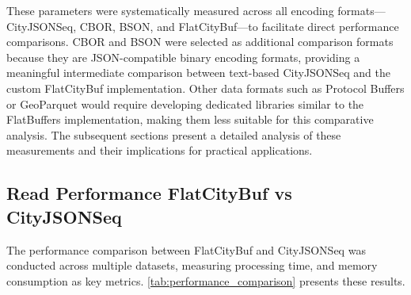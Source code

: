 These parameters were systematically measured across all encoding formats—CityJSONSeq, CBOR, BSON, and FlatCityBuf—to facilitate direct performance comparisons. CBOR and BSON were selected as additional comparison formats because they are JSON-compatible binary encoding formats, providing a meaningful intermediate comparison between text-based CityJSONSeq and the custom FlatCityBuf implementation. Other data formats such as Protocol Buffers or GeoParquet would require developing dedicated libraries similar to the FlatBuffers implementation, making them less suitable for this comparative analysis. The subsequent sections present a detailed analysis of these measurements and their implications for practical applications.

\subsection{Read Performance FlatCityBuf vs CityJSONSeq}
\label{result:benchmark_on_local_environment:read_performance_flatcitybuf_vs_cityjsonseq}

The performance comparison between FlatCityBuf and CityJSONSeq was conducted across multiple datasets, measuring processing time, and memory consumption as key metrics. \autoref{tab:performance_comparison} presents these results.

